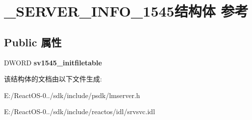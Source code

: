 \hypertarget{struct___s_e_r_v_e_r___i_n_f_o__1545}{}\section{\+\_\+\+S\+E\+R\+V\+E\+R\+\_\+\+I\+N\+F\+O\+\_\+1545结构体 参考}
\label{struct___s_e_r_v_e_r___i_n_f_o__1545}
\subsection*{Public 属性}
\begin{DoxyCompactItemize}
\item 
\mbox{\label{struct___s_e_r_v_e_r___i_n_f_o__1545_a0a523ea05f33efbce9585e1fec2d5cc4}} 
D\+W\+O\+RD {\bfseries sv1545\+\_\+initfiletable}
\end{DoxyCompactItemize}


该结构体的文档由以下文件生成\+:\begin{DoxyCompactItemize}
\item 
E\+:/\+React\+O\+S-\/0../sdk/include/psdk/lmserver.\+h\item 
E\+:/\+React\+O\+S-\/0../sdk/include/reactos/idl/srvsvc.\+idl\end{DoxyCompactItemize}
